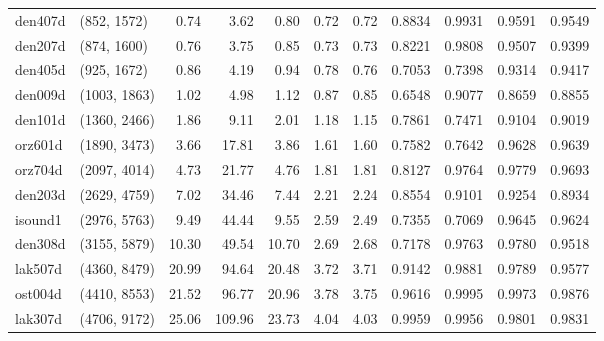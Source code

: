 \begin{tabular}{llrrrrrrrrr}
 den407d &  (852, 1572) &  0.74 &   3.62 &  0.80 &  0.72 &   0.72 &   0.8834 &   0.9931 &     0.9591 &      0.9549 \\
 den207d &  (874, 1600) &  0.76 &   3.75 &  0.85 &  0.73 &   0.73 &   0.8221 &   0.9808 &     0.9507 &      0.9399 \\
 den405d &  (925, 1672) &  0.86 &   4.19 &  0.94 &  0.78 &   0.76 &   0.7053 &   0.7398 &     0.9314 &      0.9417 \\
 den009d & (1003, 1863) &  1.02 &   4.98 &  1.12 &  0.87 &   0.85 &   0.6548 &   0.9077 &     0.8659 &      0.8855 \\
 den101d & (1360, 2466) &  1.86 &   9.11 &  2.01 &  1.18 &   1.15 &   0.7861 &   0.7471 &     0.9104 &      0.9019 \\
 orz601d & (1890, 3473) &  3.66 &  17.81 &  3.86 &  1.61 &   1.60 &   0.7582 &   0.7642 &     0.9628 &      0.9639 \\
 orz704d & (2097, 4014) &  4.73 &  21.77 &  4.76 &  1.81 &   1.81 &   0.8127 &   0.9764 &     0.9779 &      0.9693 \\
 den203d & (2629, 4759) &  7.02 &  34.46 &  7.44 &  2.21 &   2.24 &   0.8554 &   0.9101 &     0.9254 &      0.8934 \\
 isound1 & (2976, 5763) &  9.49 &  44.44 &  9.55 &  2.59 &   2.49 &   0.7355 &   0.7069 &     0.9645 &      0.9624 \\
 den308d & (3155, 5879) & 10.30 &  49.54 & 10.70 &  2.69 &   2.68 &   0.7178 &   0.9763 &     0.9780 &      0.9518 \\
 lak507d & (4360, 8479) & 20.99 &  94.64 & 20.48 &  3.72 &   3.71 &   0.9142 &   0.9881 &     0.9789 &      0.9577 \\
 ost004d & (4410, 8553) & 21.52 &  96.77 & 20.96 &  3.78 &   3.75 &   0.9616 &   0.9995 &     0.9973 &      0.9876 \\
 lak307d & (4706, 9172) & 25.06 & 109.96 & 23.73 &  4.04 &   4.03 &   0.9959 &   0.9956 &     0.9801 &      0.9831 \\
\bottomrule
\end{tabular}
